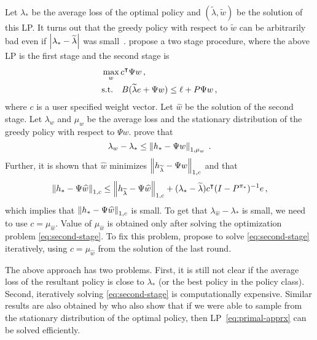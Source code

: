 \documentclass[11pt]{article}
\begin{document}
Let $\lambda_*$ be the average loss of the optimal policy and $(\widetilde\lambda, \widetilde w)$ be the solution of this LP. It turns out that the greedy policy with respect to $\widetilde w$ can be arbitrarily bad even if $\left\vert\lambda_* - \widetilde \lambda\right\vert$ was small~\citep{deFarias-VanRoy-NIPS-2003}. \citet{deFarias-VanRoy-NIPS-2003} propose a two stage procedure, where the above LP is the first stage and the second stage is
\begin{align}
\label{eq:second-stage}
\notag
&\max_{w} c^\top \Psi w\,, \\
&\mbox{s.t.}\quad B(\widetilde\lambda e + \Psi w) \le \ell + P \Psi w \, ,
\end{align}
where $c$ is a user specified weight vector. Let $\widehat w$ be the solution of the second stage. Let $\lambda_w$ and $\mu_w$ be the average loss and the stationary distribution of the greedy policy with respect to $\Psi w$. \citet{deFarias-VanRoy-NIPS-2003} prove that
\[
\lambda_w - \lambda_* \le \left\Vert h_* - \Psi w\right\Vert_{1, \mu_w} \; .
\]
Further, it is shown that $\widehat w$ minimizes $\left\Vert h_{\widetilde\lambda} - \Psi w\right\Vert_{1, c}$ and that
\[
\left\Vert h_* - \Psi \widehat w\right\Vert_{1, c} \le \left\Vert h_{\widetilde\lambda} - \Psi \widehat w\right\Vert_{1, c} + (\lambda_* - \widetilde \lambda) c^\intercal (I - P^{\pi_*})^{-1} e\,,
\]
which implies that $\left\Vert h_* - \Psi \widehat w\right\Vert_{1, c}$ is small. To get that $\lambda_{\widehat w} - \lambda_*$ is small, we need to use $c = \mu_{\widehat w}$. Value of  $\mu_{\widehat w}$ is obtained only after solving the optimization problem \eqref{eq:second-stage}. To fix this problem, \citet{deFarias-VanRoy-NIPS-2003} propose to solve \eqref{eq:second-stage} iteratively, using $c = \mu_{\widehat w}$ from the solution of the last round.

The above approach has two problems. First, it is still not clear if the average loss of the resultant policy is close to $\lambda_*$ (or the best policy in the policy class). Second, iteratively solving \eqref{eq:second-stage} is computationally expensive. Similar results are also obtained by \citet{Desai-Farias-Moallemi-2012} who also show that if we were able to sample from the stationary distribution of the optimal policy, then LP~\eqref{eq:primal-apprx} can be solved efficiently.
\end{document}
